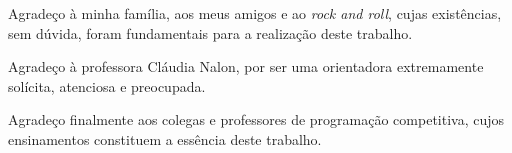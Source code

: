 \indent

Agradeço à minha família, aos meus amigos e ao \textit{rock and roll}, cujas existências, sem dúvida, foram fundamentais para a realização deste trabalho.

Agradeço à professora Cláudia Nalon, por ser uma orientadora extremamente solícita, atenciosa e preocupada.

Agradeço finalmente aos colegas e professores de programação competitiva, cujos ensinamentos constituem a essência deste trabalho.